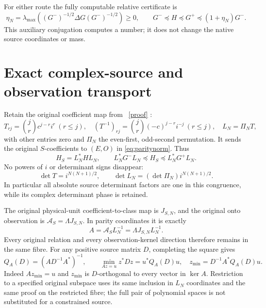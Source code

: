 \documentclass[11pt]{article}
\begin{document}
For either route the fully computable relative certificate is
\begin{equation}\label{eq:eta}
 \eta_N=\lambda_{\max}((G^-)^{-1/2}\Delta G(G^-)^{-1/2})\ge0,
 \qquad G^-\preceq H\preceq G^+\preceq(1+\eta_N)G^-.
\end{equation}
This auxiliary conjugation computes a number; it does not change the
native source coordinates or mass.

\section{Exact complex-source and observation transport}

Retain the original coefficient map from \cite{PP}%
~\href{https://github.com/KokunoYumeto/zeta-function-research-reader/blob/5992ad50c0f2a06921f1fcaded7b4e38097c0739/workbenches/splitzero-tandem/continuations/20260920-original-kernel-mixed-determinants/providers/PARITY_POLLACZEK_NATIVE_RECEIVER.tex\#L1}{[proof]}%
{}:
\begin{equation}\label{eq:transport}
 T_{rj}=\binom jr c^{j-r}i^r\ (r\le j),\quad
 (T^{-1})_{rj}=\binom jr(-c)^{j-r}i^{-j}\ (r\le j),\quad
 L_N=\Pi_NT,
\end{equation}
with other entries zero and $\Pi_N$ the even-first, odd-second
permutation.  It sends the original $S$-coefficients to $(E,O)$ in
\eqref{eq:paritynorm}.  Thus
\begin{equation}\label{eq:Sbounds}
 H_S=L_N^*HL_N,\qquad
 L_N^*G^-L_N\preceq H_S\preceq L_N^*G^+L_N.
\end{equation}
No powers of $i$ or determinant signs disappear:
\[
 \det T=i^{N(N+1)/2},\qquad
 \det L_N=(\det\Pi_N)i^{N(N+1)/2}.
\]
In particular all absolute source determinant factors are one in
this congruence, while its complex determinant phase is retained.

The original physical-unit coefficient-to-class map is $J_{S,N}$,
and the original onto observation is $\mathcal A_S=\Lambda J_{S,N}$.
In parity coordinates it is exactly
\begin{equation}\label{eq:A}
 A=\mathcal A_SL_N^{-1}=\Lambda J_{S,N}L_N^{-1}.
\end{equation}
Every original relation and every observation-kernel direction
therefore remains in the same fibre.  For any positive source matrix
$D$, completing the square gives
\begin{equation}\label{eq:minimum}
 Q_A(D)=(AD^{-1}A^*)^{-1},\qquad
 \min_{Az=u}z^*Dz=u^*Q_A(D)u,\quad
 z_{\min}=D^{-1}A^*Q_A(D)u.
\end{equation}
Indeed $Az_{\min}=u$ and $z_{\min}$ is $D$-orthogonal to every
vector in $\ker A$.  Restriction to a specified original subspace
uses its same inclusion in $L_N$ coordinates and the same proof on
the restricted fibre; the full pair of polynomial spaces is not
substituted for a constrained source.
\end{document}

